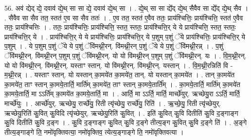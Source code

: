 \documentclass[17pt]{extarticle}
\begin{document}
56. अव॑ द्येद् द्ये॒ दवाव॑ द्ये॒थ् सा सा द्ये॒ दवाव॑ द्ये॒थ् सा । . द्ये॒थ् सा सा द्ये᳚द् द्ये॒थ् सैवैव सा द्ये᳚द् द्ये॒थ् सैव । . सैवैव सा सैव तत॒ स्तत॑ ए॒व सा सैव ततः॑ । . ए॒व तत॒ स्तत॑ ए॒वैव ततः॒ प्राय॑श्चित्तिः॒ प्राय॑श्चित्ति॒ स्तत॑ ए॒वैव ततः॒ प्राय॑श्चित्तिः । . ततः॒ प्राय॑श्चित्तिः॒ प्राय॑श्चित्ति॒ स्तत॒ स्ततः॒ प्राय॑श्चित्ति॒र् ये ये प्राय॑श्चित्ति॒ स्तत॒ स्ततः॒ प्राय॑श्चित्ति॒र् ये । . प्राय॑श्चित्ति॒र् ये ये प्राय॑श्चित्तिः॒ प्राय॑श्चित्ति॒र् ये प॒शुम् प॒शुं ॅये प्राय॑श्चित्तिः॒ प्राय॑श्चित्ति॒र् ये प॒शुम् । . ये प॒शुम् प॒शुं ॅये ये प॒शुं ॅवि॑मथ्नी॒रन्. वि॑मथ्नी॒रन् प॒शुं ॅये ये प॒शुं ॅवि॑मथ्नी॒रन्न् । . प॒शुं ॅवि॑मथ्नी॒रन्. वि॑मथ्नी॒रन् प॒शुम् प॒शुं ॅवि॑मथ्नी॒रन्. यो यो वि॑मथ्नी॒रन् प॒शुम् प॒शुं ॅवि॑मथ्नी॒रन्. यः । . वि॒म॒थ्नी॒रन्. यो यो वि॑मथ्नी॒रन्. वि॑मथ्नी॒रन्. यस्ताꣳ स्तान्. यो वि॑मथ्नी॒रन्. वि॑मथ्नी॒रन्. यस्तान् । . वि॒म॒थ्नी॒रन्निति॑ वि - म॒थ्नी॒रन्न् । . यस्ताꣳ स्तान्. यो यस्तान् का॒मये॑त का॒मये॑त॒ तान्. यो यस्तान् का॒मये॑त । . तान् का॒मये॑त का॒मये॑त॒ ताꣳ स्तान् का॒मये॒तार्ति॒ मार्ति॑म् का॒मये॑त॒ ताꣳ स्तान् का॒मये॒तार्ति᳚म् । . का॒मये॒तार्ति॒ मार्ति॑म् का॒मये॑त का॒मये॒तार्ति॒ मा ऽऽर्ति॑म् का॒मये॑त का॒मये॒तार्ति॒ मा । . आर्ति॒ मा ऽऽर्ति॒ मार्ति॒ मार्च्छे॑युर्. ऋच्छेयु॒रा ऽऽर्ति॒ मार्ति॒ मार्च्छे॑युः । . आर्च्छे॑युर्. ऋच्छेयु॒ रार्च्छे॑यु॒ रिती त्यृ॑च्छेयु॒ रार्च्छे॑यु॒ रिति॑ । . ऋ॒च्छे॒यु॒ रिती त्यृ॑च्छेयुर्. ऋच्छेयु॒रिति॑ कु॒वित् कु॒विदि त्यृ॑च्छेयुर्. ऋच्छेयु॒रिति॑ कु॒वित् । . इति॑ कु॒वित् कु॒वि दितीति॑ कु॒वि द॒ङ्गाङ्ग कु॒वि दितीति॑ कु॒वि द॒ङ्ग । . कु॒वि द॒ङ्गाङ्ग कु॒वित् कु॒वि द॒ङ्गे तीत्य॒ङ्ग कु॒वित् कु॒वि द॒ङ्गे ति॑ । . अ॒ङ्गे तीत्य॒ङ्गाङ्गे ति॒ नमो॑वृक्तिवत्या॒ नमो॑वृक्तिव॒ त्येत्य॒ङ्गाङ्गे ति॒ नमो॑वृक्तिवत्या । \newline
\end{document}
